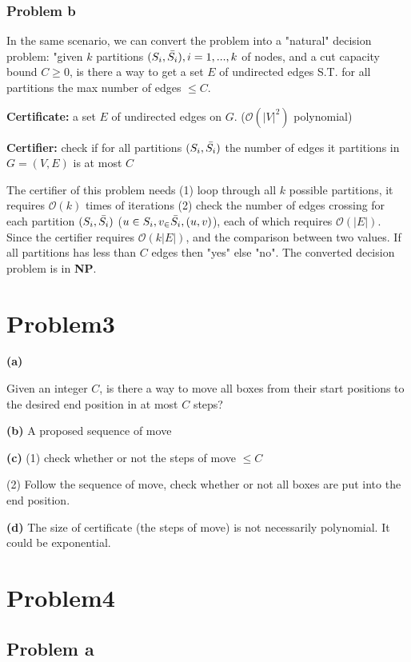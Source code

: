 \documentclass[openany]{article}
\begin{document}
\subsubsection*{Problem b}
In the same scenario, we can convert the problem into a "natural" decision problem: "given $k$ partitions $(S_i, \Bar{S_i}), i = 1, . . . , k$ of nodes, and a cut capacity bound $C \geqslant 0$, is there a way to get a set $E$ of undirected edges S.T. for all partitions the max number of edges $\leqslant C$.

\textbf{Certificate:} a set $E$ of undirected edges on $G$. ($\mathcal{O}(|V|^2)$ polynomial)

\textbf{Certifier:} check if for all partitions $(S_i,\Bar{S_i})$ the number of edges it partitions in $G=(V,E)$ is at most $C$

The certifier of this problem needs (1) loop through all $k$ possible partitions, it requires $\mathcal{O}(k)$ times of iterations (2) check the number of edges crossing for each partition $(S_i, \Bar{S_i})$ ($u \in S_i, v_\in \Bar{S_i}, (u,v)$), each of which requires $\mathcal{O}(|E|)$. Since the certifier requires $\mathcal{O}(k|E|)$, and the comparison between two values. If all partitions has less than $C$ edges then "yes" else "no". The converted decision problem is in \textbf{NP}.

\section*{Problem3}

\textbf{(a)}

Given an integer $C$, is there a way to move all boxes from their start positions to the desired end position in at most $C$ steps?

\textbf{(b)}
A proposed sequence of move

\textbf{(c)}
(1) check whether or not the steps of move $\leqslant C$

(2)  Follow the sequence of move, check whether or not all boxes are put into the end position.

\textbf{(d)}
The size of certificate (the steps of move) is not necessarily polynomial. It could be exponential.


\section*{Problem4}
\subsection*{Problem a}
\end{document}
